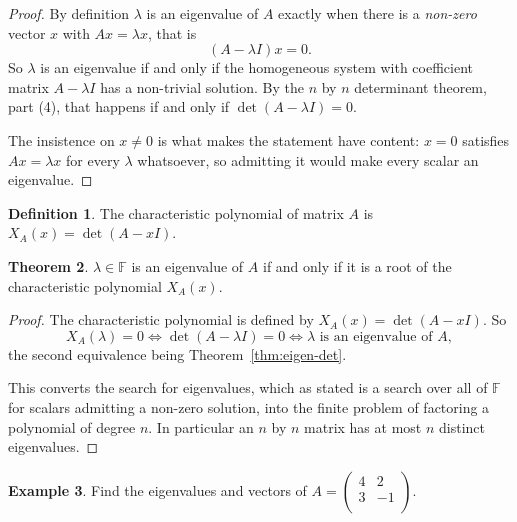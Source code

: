\documentclass[11pt,a4paper]{article}
\theoremstyle{definition}
\newtheorem{thm}{Theorem}[subsection]
\newtheorem{defn}[thm]{Definition}
\newtheorem{exa}[thm]{Example}
\begin{document}
\begin{proof}
By definition $\lambda$ is an eigenvalue of $A$ exactly when there is a
\emph{non-zero} vector $x$ with $Ax=\lambda x$, that is
$$(A-\lambda I)x=0.$$
So $\lambda$ is an eigenvalue if and only if the homogeneous system with
coefficient matrix $A-\lambda I$ has a non-trivial solution. By the $n$ by $n$
determinant theorem, part (4), that happens if and only if
$\det(A-\lambda I)=0$.

The insistence on $x\neq 0$ is what makes the statement have content: $x=0$
satisfies $Ax=\lambda x$ for every $\lambda$ whatsoever, so admitting it would
make every scalar an eigenvalue.
\end{proof}


\begin{defn}
The characteristic polynomial of matrix $A$ is $X_A(x)=\det (A-xI)$.
\end{defn}


\begin{thm}\label{thm:eigen-char-poly}
$\lambda \in \mathbb{F}$ is an eigenvalue of $A$ if and only if it is a root of
the characteristic polynomial $X_A(x)$.
\end{thm}

\begin{proof}
The characteristic polynomial is defined by $X_A(x)=\det(A-xI)$. So
$$X_A(\lambda)=0 \iff \det(A-\lambda I)=0 \iff \lambda \text{ is an
eigenvalue of } A,$$
the second equivalence being Theorem~\ref{thm:eigen-det}.

This converts the search for eigenvalues, which as stated is a search over all
of $\mathbb{F}$ for scalars admitting a non-zero solution, into the finite
problem of factoring a polynomial of degree $n$. In particular an $n$ by $n$
matrix has at most $n$ distinct eigenvalues.
\end{proof}


\begin{exa}\label{exa:eigen-example}
Find the eigenvalues and vectors of $
A=
\begin{pmatrix}
4&2\\3&-1\\
\end{pmatrix}
$.
\end{exa}
\end{document}

